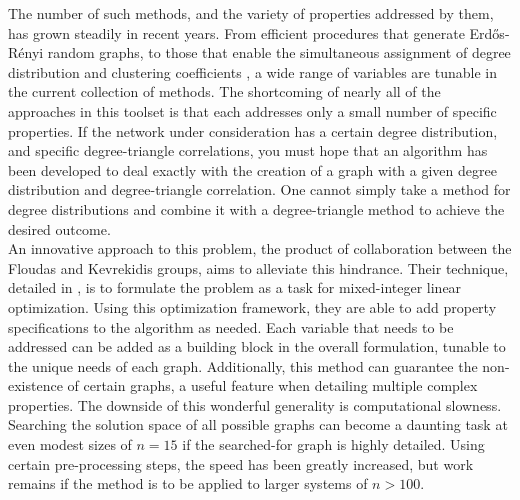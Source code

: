 \documentclass[11pt]{article}
\begin{document}
The number of such methods, and the variety of properties addressed by them, has grown steadily in recent years. From efficient procedures that generate Erd\H{o}s-R\'{e}nyi random graphs, to those that enable the simultaneous assignment of degree distribution and clustering coefficients \cite{Batagelj2005} \cite{Deijfen2009}, a wide range of variables are tunable in the current collection of methods. The shortcoming of nearly all of the approaches in this toolset is that each addresses only a small number of specific properties. If the network under consideration has a certain degree distribution, and specific degree-triangle correlations, you must hope that an algorithm has been developed to deal exactly with the creation of a graph with a given degree distribution and degree-triangle correlation. One cannot simply take a method for degree distributions and combine it with a degree-triangle method to achieve the desired outcome. \vspace{1mm}\\
An innovative approach to this problem, the product of collaboration between the Floudas and Kevrekidis groups, aims to alleviate this hindrance. Their technique, detailed in \cite{Gounaris2013}, is to formulate the problem as a task for mixed-integer linear optimization. Using this optimization framework, they are able to add property specifications to the algorithm as needed. Each variable that needs to be addressed can be added as a building block in the overall formulation, tunable to the unique needs of each graph. Additionally, this method can guarantee the non-existence of certain graphs, a useful feature when detailing multiple complex properties. The downside of this wonderful generality is computational slowness. Searching the solution space of all possible graphs can become a daunting task at even modest sizes of $n=15$ if the searched-for graph is highly detailed. Using certain pre-processing steps, the speed has been greatly increased, but work remains if the method is to be applied to larger systems of $n>100$. 
\end{document}

